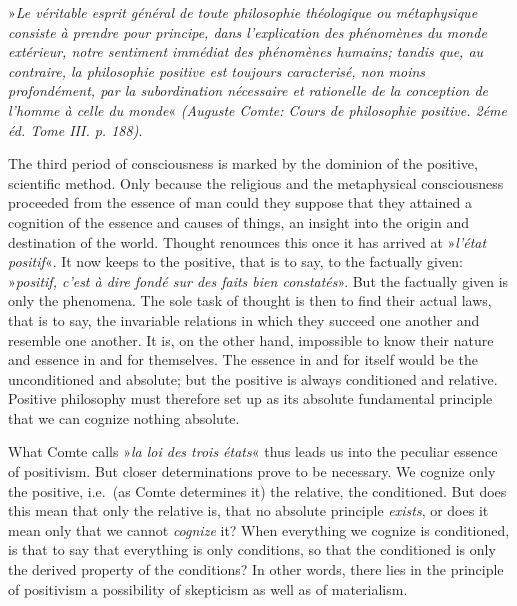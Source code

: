 \documentclass[12pt,a4paper,openany]{book}
\newcommand{\opage}[1]{\marginnote{\footnotesize\textit{[#1]}}}
\begin{document}
\opage{201}»\textit{Le véritable esprit général de toute philosophie théologique
ou métaphysique consiste à prendre pour principe,
dans l'explication des phénomènes du monde extérieur,
notre sentiment immédiat des phénomènes humains; tandis
que, au contraire, la philosophie positive est toujours caracterisé,
non moins profondément, par la subordination
nécessaire et rationelle de la conception de l'homme à celle
du monde}« \textit{(Auguste Comte: Cours de philosophie positive.
2éme éd. Tome III. p. 188)}.

The third period of consciousness is marked by the dominion of the
positive, scientific method. Only because the religious
and the metaphysical consciousness proceeded from the essence of
man could they suppose that they attained a cognition of the essence
and causes of things, an insight into the origin and
destination of the world. Thought renounces this once it has
arrived at »\textit{l'état positif}«. It now keeps to the positive,
that is to say, to the factually given: »\textit{positif, c'est à dire
fondé sur des faits bien constatés}». But the factually given
is only the phenomena. The sole task of thought is then to
find their actual laws, that is to say, the invariable relations
in which they succeed one another and resemble one another.
It is, on the other hand, impossible to know their nature and essence in
and for themselves. The essence in and for itself would be the unconditioned
and absolute; but the positive is always conditioned and relative.
Positive philosophy must therefore set up as its absolute
fundamental principle that we can cognize nothing absolute.

What Comte calls »\textit{la loi des trois états}« thus leads us
into the peculiar essence of positivism. But closer determinations
prove to be necessary. We cognize only the positive,
i.e.\ (as Comte determines it) the relative, the conditioned.
But does this mean that only the relative is, that no
absolute principle \emph{exists}, or does it mean only that we cannot
\emph{cognize} it? When everything we cognize is conditioned, is
that to say that everything is only conditions, so that the conditioned
is only the derived property of the conditions? In other
\opage{202}words, there lies in the principle of positivism a possibility of skepticism
as well as of materialism.
\end{document}
